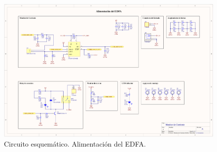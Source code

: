 \begin{figure}[H]
\centering
\includegraphics[width=1.7\textwidth]{./Figures/circ3.png}
\caption{Circuito esquemático. Alimentación del EDFA.}
\end{figure}